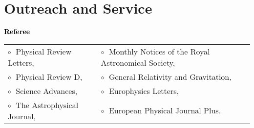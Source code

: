 \documentclass[letterpaper]{moderncv}
\begin{document}







\section{Outreach and Service}

\textbf{\textcolor{black}{Referee}}\vspace{0.1cm}\\
\begin{tabular}{@{\hskip 0.4cm}l@{\hskip 0.4in}l}
$\circ\;$ Physical Review Letters, & $\circ\;$ Monthly Notices of the Royal Astronomical Society, \\
$\circ\;$ Physical Review D, & $\circ\;$ General Relativity and Gravitation,\\
$\circ\;$ Science Advances, & $\circ\;$ Europhysics Letters,\\
$\circ\;$ The Astrophysical Journal, &  $\circ\;$ European Physical Journal Plus.
\end{tabular}
\vspace{+0.15cm}
 
\end{document}
